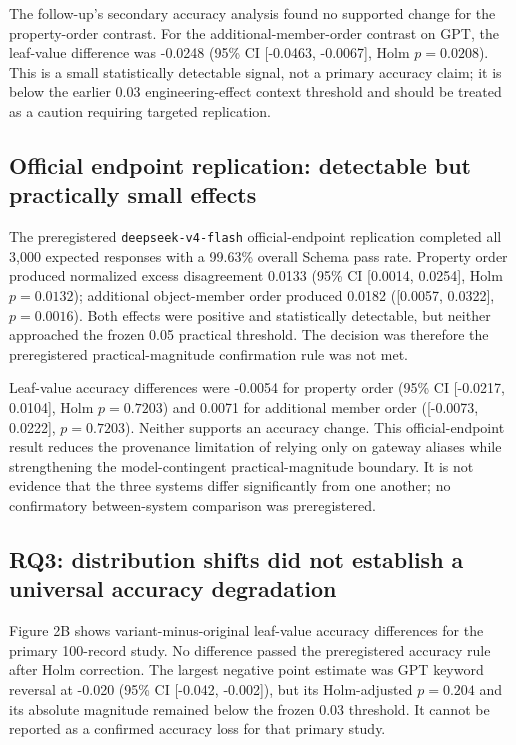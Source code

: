 \documentclass[10pt]{article}
\begin{document}
The follow-up's secondary accuracy analysis found no supported change for the property-order contrast. For the additional-member-order contrast on GPT, the leaf-value difference was -0.0248 (95\% CI [-0.0463, -0.0067], Holm \(p=0.0208\)). This is a small statistically detectable signal, not a primary accuracy claim; it is below the earlier 0.03 engineering-effect context threshold and should be treated as a caution requiring targeted replication.

\subsection{Official endpoint replication: detectable but practically small effects}
The preregistered \texttt{deepseek-v4-flash} official-endpoint replication completed all 3,000 expected responses with a 99.63\% overall Schema pass rate. Property order produced normalized excess disagreement 0.0133 (95\% CI [0.0014, 0.0254], Holm \(p=0.0132\)); additional object-member order produced 0.0182 ([0.0057, 0.0322], \(p=0.0016\)). Both effects were positive and statistically detectable, but neither approached the frozen 0.05 practical threshold. The decision was therefore the preregistered practical-magnitude confirmation rule was not met.

Leaf-value accuracy differences were -0.0054 for property order (95\% CI [-0.0217, 0.0104], Holm \(p=0.7203\)) and 0.0071 for additional member order ([-0.0073, 0.0222], \(p=0.7203\)). Neither supports an accuracy change. This official-endpoint result reduces the provenance limitation of relying only on gateway aliases while strengthening the model-contingent practical-magnitude boundary. It is not evidence that the three systems differ significantly from one another; no confirmatory between-system comparison was preregistered.

\subsection{RQ3: distribution shifts did not establish a universal accuracy degradation}
Figure 2B shows variant-minus-original leaf-value accuracy differences for the primary 100-record study. No difference passed the preregistered accuracy rule after Holm correction. The largest negative point estimate was GPT keyword reversal at -0.020 (95\% CI [-0.042, -0.002]), but its Holm-adjusted \(p=0.204\) and its absolute magnitude remained below the frozen 0.03 threshold. It cannot be reported as a confirmed accuracy loss for that primary study.
\end{document}
